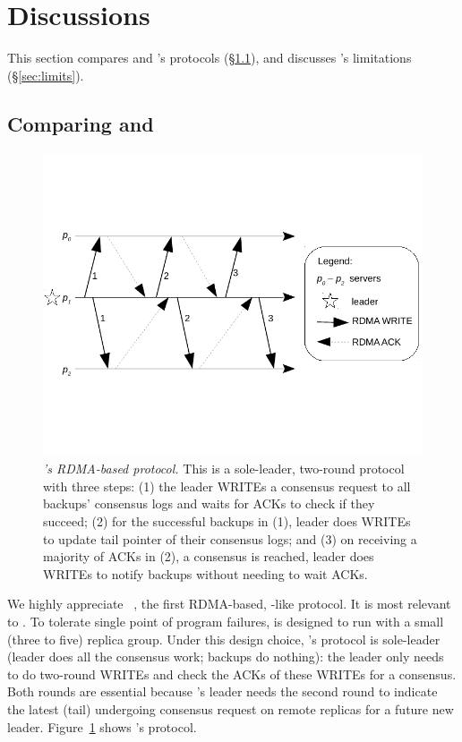 \section{Discussions}\label{sec:discuss}
% 
This section compares \xxx and \dare's protocols (\S\ref{sec:compare}), and 
discusses \xxx's limitations (\S\ref{sec:limits}).

\subsection{Comparing \xxx and \dare}\label{sec:compare}

\begin{figure}[t]
\centering
\vspace{-.5in}
\includegraphics[width=.35\textwidth]{figures/dare_algo}
\vspace{-.6in}
\caption{{\em \dare's RDMA-based protocol.} This is a sole-leader, 
two-round protocol with three steps: (1) the leader WRITEs a consensus request 
to all backups' consensus logs and waits for ACKs to check if they succeed; 
(2) for the successful backups in (1), leader does WRITEs to update tail 
pointer of their consensus logs; and (3) on receiving a majority of ACKs in (2), 
a consensus is reached, leader does WRITEs to notify backups without needing to 
wait ACKs.}
\label{fig:dare}
\vspace{-.20in}
\end{figure}

We highly appreciate \dare~\cite{dare:hpdc15}, the first RDMA-based, 
\paxos-like protocol. It is most relevant to \xxx. To tolerate single point of 
program failures, \dare is designed to run with a small (three to five) replica 
group. Under this design choice, \dare's protocol is sole-leader (leader 
does all the consensus work; backups do nothing): the leader only needs to do 
two-round WRITEs and check the ACKs of these WRITEs for a consensus. Both 
rounds are essential because \dare's leader needs the second round to indicate 
the latest (tail) undergoing consensus request on remote replicas for a future 
new leader. Figure~\ref{fig:dare} shows \dare's protocol.

